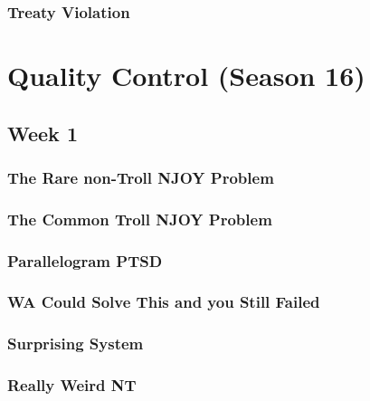 \documentclass[titlepage=true]{scrartcl}
\begin{document}
	\subsubsection{Treaty Violation}
	\label{15-2-7}
	
	\newpage

\section{Quality Control (Season 16)}

    \subsection{Week 1}

    \subsubsection{The Rare non-Troll NJOY Problem}
	\label{16-1-1}
	
	\newpage

	\subsubsection{The Common Troll NJOY Problem}
	\label{16-1-2}
	
	\newpage

	\subsubsection{Parallelogram PTSD}
	\label{16-1-3}
	
	\newpage

	\subsubsection{WA Could Solve This and you Still Failed}
	\label{16-1-4}
	
	\newpage

    \subsubsection{Surprising System}
	\label{16-1-5}
	
	\newpage

	\subsubsection{Really Weird NT}
	\label{16-1-6}
	
	\newpage
\end{document}
